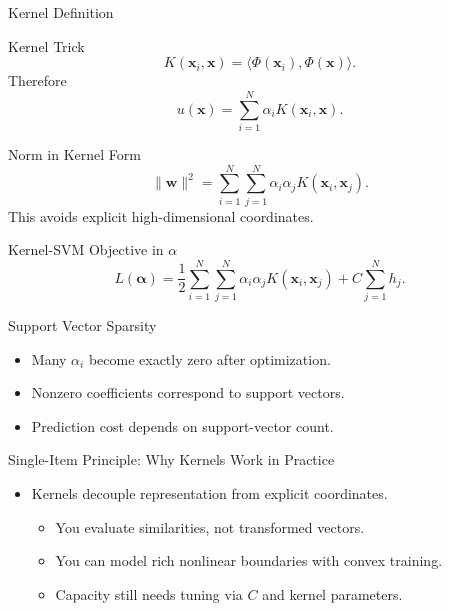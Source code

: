 \documentclass[10pt]{beamer}
\begin{document}
\begin{frame}{Kernel Definition}
  \justifying
  \begin{conceptbox}{Kernel Trick}
    \[
      K(\bm{x}_i,\bm{x})=\langle\Phi(\bm{x}_i),\Phi(\bm{x})\rangle.
    \]
    Therefore
    \[
      u(\bm{x})=\sum_{i=1}^N\alpha_i K(\bm{x}_i,\bm{x}).
    \]
  \end{conceptbox}
\end{frame}

\begin{frame}{Norm in Kernel Form}
  \justifying
  \[
    \|\bm{w}\|^2
    =
    \sum_{i=1}^N\sum_{j=1}^N
    \alpha_i\alpha_j K(\bm{x}_i,\bm{x}_j).
  \]
  This avoids explicit high-dimensional coordinates.
\end{frame}

\begin{frame}{Kernel-SVM Objective in $\alpha$}
  \justifying
  \[
    L(\boldsymbol\alpha)
    =
    \frac{1}{2}
    \sum_{i=1}^N\sum_{j=1}^N
    \alpha_i\alpha_jK(\bm{x}_i,\bm{x}_j)
    + C\sum_{j=1}^N h_j.
  \]
\end{frame}

\begin{frame}{Support Vector Sparsity}
  \justifying
  \begin{itemize}
    \item Many $\alpha_i$ become exactly zero after optimization.
    \item Nonzero coefficients correspond to support vectors.
    \item Prediction cost depends on support-vector count.
  \end{itemize}
\end{frame}

\begin{frame}{Single-Item Principle: Why Kernels Work in Practice}
  \justifying
  \begin{itemize}
    \item Kernels decouple representation from explicit coordinates.
    \begin{itemize}
      \item You evaluate similarities, not transformed vectors.
      \item You can model rich nonlinear boundaries with convex training.
      \item Capacity still needs tuning via $C$ and kernel parameters.
    \end{itemize}
  \end{itemize}
\end{frame}
\end{document}

